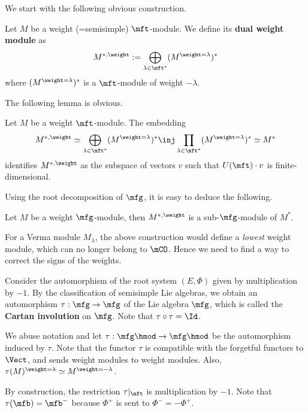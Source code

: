 	We start with the following obvious construction.	

	\begin{constr}
		Let $M$ be a weight (=semisimple) $\mft$-module. We define its \textbf{dual weight module} as
		\[
			M^{*,\weight}:= \bigoplus_{\lambda\in \mft^*} (M^{\weight=\lambda})^*
		\]
		where $(M^{\weight=\lambda})^*$ is a $\mft$-module of weight $-\lambda$.
	\end{constr}

	The following lemma is obvious.

	\begin{lem}
		Let $M$ be a weight $\mft$-module. The embedding
		\[
			M^{*,\weight}\simeq \bigoplus_{\lambda\in \mft^*} (M^{\weight=\lambda})^* \inj \prod_{\lambda\in \mft^*} (M^{\weight=\lambda})^* \simeq M^*
		\]
		identifies $M^{*,\weight}$ as the subspace of vectors $v$ such that $U(\mft)\cdot v$ is finite-dimensional.

	\end{lem}

	Using the root decomposition of $\mfg$, it is easy to deduce the following.

	\begin{cor}
		Let $M$ be a weight $\mfg$-module, then $M^{*,\weight}$ is a sub-$\mfg$-module of $M^*$.
	\end{cor}

	For a Verma module $M_\lambda$, the above construction would define a \emph{lowest} weight module, which can no longer belong to $\mCO$. Hence we need to find a way to correct the signs of the weights.

	\begin{constr}
		Consider the automorphism of the root system $(E,\Phi)$ given by multiplication by $-1$. By the classification of semisimple Lie algebras, we obtain an automorphism $\tau: \mfg \to \mfg$ of the Lie algebra $\mfg$, which is called the \textbf{Cartan involution} on $\mfg$. Note that $\tau\circ\tau = \Id$.

		We abuse notation and let $\tau: \mfg\hmod \to \mfg\hmod$ be the automorphism induced by $\tau$. Note that the functor $\tau$ is compatible with the forgetful functors to $\Vect$, and sends weight modules to weight modules. Also, $\tau (M)^{\weight = \lambda} \simeq M^{\weight = -\lambda}$.
	\end{constr}

	\begin{rem}
		By construction, the restriction $\tau|_{\mft}$ is multiplication by $-1$. Note that $\tau(\mfb) =\mfb^-$ because $\Phi^+$ is sent to $\Phi^-=-\Phi^+$. 
	\end{rem}

